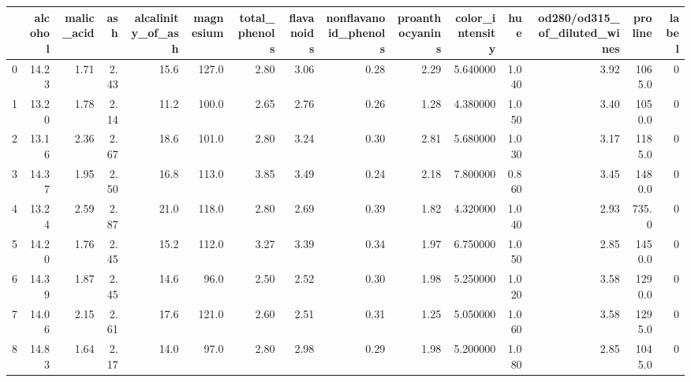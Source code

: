\documentclass{article}
\begin{document}
\begin{tabular}{lrrrrrrrrrrrrrr}
    \toprule
    {} &  alcohol &  malic\_acid &   ash &  alcalinity\_of\_ash &  magnesium &  total\_phenols &  flavanoids &  nonflavanoid\_phenols &  proanthocyanins &  color\_intensity &    hue &  od280/od315\_of\_diluted\_wines &  proline &  label \\
    \midrule
    0   &    14.23 &        1.71 &  2.43 &               15.6 &      127.0 &           2.80 &        3.06 &                  0.28 &             2.29 &         5.640000 &  1.040 &                          3.92 &   1065.0 &      0 \\
    1   &    13.20 &        1.78 &  2.14 &               11.2 &      100.0 &           2.65 &        2.76 &                  0.26 &             1.28 &         4.380000 &  1.050 &                          3.40 &   1050.0 &      0 \\
    2   &    13.16 &        2.36 &  2.67 &               18.6 &      101.0 &           2.80 &        3.24 &                  0.30 &             2.81 &         5.680000 &  1.030 &                          3.17 &   1185.0 &      0 \\
    3   &    14.37 &        1.95 &  2.50 &               16.8 &      113.0 &           3.85 &        3.49 &                  0.24 &             2.18 &         7.800000 &  0.860 &                          3.45 &   1480.0 &      0 \\
    4   &    13.24 &        2.59 &  2.87 &               21.0 &      118.0 &           2.80 &        2.69 &                  0.39 &             1.82 &         4.320000 &  1.040 &                          2.93 &    735.0 &      0 \\
    5   &    14.20 &        1.76 &  2.45 &               15.2 &      112.0 &           3.27 &        3.39 &                  0.34 &             1.97 &         6.750000 &  1.050 &                          2.85 &   1450.0 &      0 \\
    6   &    14.39 &        1.87 &  2.45 &               14.6 &       96.0 &           2.50 &        2.52 &                  0.30 &             1.98 &         5.250000 &  1.020 &                          3.58 &   1290.0 &      0 \\
    7   &    14.06 &        2.15 &  2.61 &               17.6 &      121.0 &           2.60 &        2.51 &                  0.31 &             1.25 &         5.050000 &  1.060 &                          3.58 &   1295.0 &      0 \\
    8   &    14.83 &        1.64 &  2.17 &               14.0 &       97.0 &           2.80 &        2.98 &                  0.29 &             1.98 &         5.200000 &  1.080 &                          2.85 &   1045.0 &      0 \\

\end{tabular}
\end{document}
